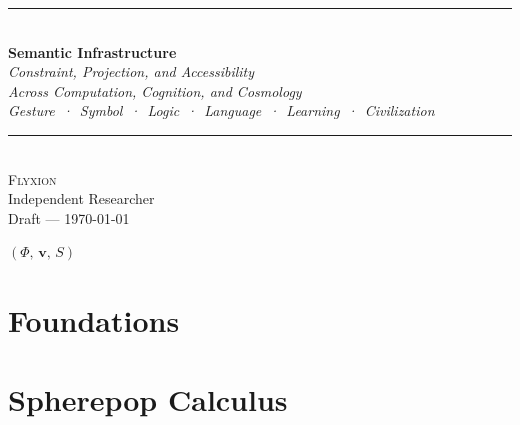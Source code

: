\documentclass[
  12pt,
  twoside,
  openright,
  a4paper
]{book}
\begin{document}
\begin{titlepage}
  \pagecolor{RSVPdeep}
  \color{white}
  \vspace*{4cm}
  \begin{center}
    {\color{RSVPaccent}\rule{0.6\linewidth}{1.5pt}}\\[1.2em]
    {\fontsize{36}{42}\selectfont\bfseries Semantic Infrastructure}\\[0.6em]
    {\color{RSVPlight}\Large\itshape
      Constraint, Projection, and Accessibility\\
      Across Computation, Cognition, and Cosmology}\\[0.4em]
    {\color{RSVPaccent!80}\small\itshape
      Gesture~·~Symbol~·~Logic~·~Language~·~Learning~·~Civilization}\\[1.2em]
    {\color{RSVPaccent}\rule{0.6\linewidth}{1.5pt}}\\[2em]
    {\Large\scshape Flyxion}\\[0.4em]
    {\color{RSVPlight!70}\normalsize Independent Researcher}\\[3cm]
    {\small\color{RSVPlight!50} Draft --- \today}
  \end{center}
  \vfill
  \begin{center}
    {\color{RSVPaccent}\Large$(\Phi,\,\mathbf{v},\,S)$}
  \end{center}
\end{titlepage}
\nopagecolor

\frontmatter
\tableofcontents
\listoffigures


\mainmatter

\part{Foundations}





\part{Spherepop Calculus}





\end{document}
